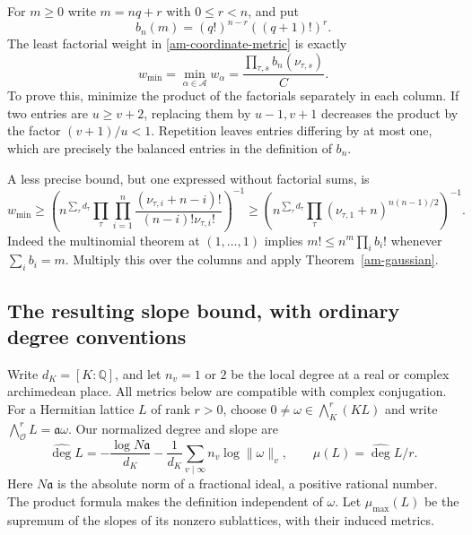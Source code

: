 For $m\ge0$ write $m=nq+r$ with $0\le r<n$, and put
\[
                    b_n(m)=(q!)^{n-r}((q+1)!)^r.
\]
The least factorial weight in \eqref{am-coordinate-metric} is exactly
\begin{equation}\label{am-min-weight}
 w_{\min}=\min_{\alpha\in\mathcal A}w_\alpha
                    =\frac{\prod_{\tau,s}b_n(\nu_{\tau,s})}{C}.
\end{equation}
To prove this, minimize the product of the factorials separately in
each column. If two entries are $u\ge v+2$, replacing them by $u-1,v+1$
decreases the product by the factor $(v+1)/u<1$. Repetition leaves
entries differing by at most one, which are precisely the balanced
entries in the definition of $b_n$.

A less precise bound, but one expressed without factorial sums, is
\begin{equation}\label{am-weight-lower}
 w_{\min}\ge
 \left(n^{\sum_\tau d_\tau}
       \prod_\tau\prod_{i=1}^n
        \frac{(\nu_{\tau,i}+n-i)!}{(n-i)!\nu_{\tau,i}!}\right)^{-1}
 \ge
 \left(n^{\sum_\tau d_\tau}
       \prod_\tau(\nu_{\tau,1}+n)^{n(n-1)/2}\right)^{-1}.
\end{equation}
Indeed the multinomial theorem at $(1,\ldots,1)$ implies
$m!\le n^m\prod_i b_i!$ whenever $\sum_i b_i=m$.
Multiply this over the columns and apply Theorem~\ref{am-gaussian}.

\subsection{The resulting slope bound, with ordinary degree conventions}

Write $d_K=[K:\mathbb Q]$, and let $n_v=1$ or $2$ be the local degree
at a real or complex archimedean place. All metrics below are compatible
with complex conjugation. For a Hermitian lattice $L$ of rank $r>0$,
choose $0\ne\omega\in\bigwedge^r_K(KL)$ and write
$\bigwedge^r_{\mathcal O}L=\mathfrak a\omega$.
Our normalized degree and slope are
\begin{equation}\label{am-degree}
 \widehat{\deg}L=-\frac{\log N\mathfrak a}{d_K}
      -\frac1{d_K}\sum_{v\mid\infty}n_v\log\|\omega\|_v,
 \qquad \mu(L)=\widehat{\deg}L/r.
\end{equation}
Here $N\mathfrak a$ is the absolute norm of a fractional ideal, a
positive rational number. The product formula makes the definition
independent of $\omega$. Let $\mu_{\max}(L)$ be the supremum of the
slopes of its nonzero sublattices, with their induced metrics.

